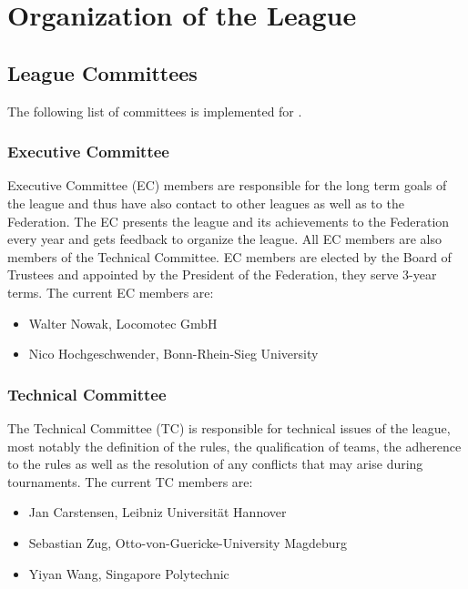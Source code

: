 \section{Organization of the League}\label{sec:organisation_of_the_league}

\subsection{League Committees}
The following list of committees is implemented for \RCAW.

\subsubsection{Executive Committee}

Executive Committee (EC) members are responsible for the long term goals of the league and thus have also contact to other leagues as well as to the \RC Federation. The EC presents the league and its achievements to the \RC Federation every year and gets feedback to organize the league. All EC members are also members of the Technical Committee. EC members are elected by the Board of Trustees and appointed by the President of the \RC Federation, they serve 3-year terms. The current EC members are:

\begin{itemize}
	\item Walter Nowak, Locomotec GmbH
	\item Nico Hochgeschwender, Bonn-Rhein-Sieg University
\end{itemize}


\subsubsection{Technical Committee}
The Technical Committee (TC) is responsible for technical issues of the league, most notably the definition of the rules, the qualification of teams, the adherence to the rules as well as the resolution of any conflicts that may arise during tournaments. The current TC members are:

\begin{itemize}
	\item Jan Carstensen, Leibniz Universit\"at Hannover
	\item Sebastian Zug, Otto-von-Guericke-University Magdeburg
	\item Yiyan Wang, Singapore Polytechnic
\end{itemize}


